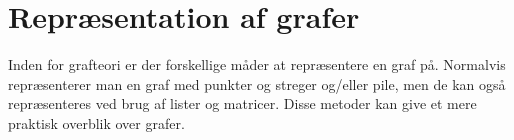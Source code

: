 \section{Repræsentation af grafer}
Inden for grafteori er der forskellige måder at repræsentere en graf på. Normalvis repræsenterer man en graf med punkter og streger og/eller pile, men de kan også repræsenteres ved brug af lister og matricer. Disse metoder kan give et mere praktisk overblik over grafer.
